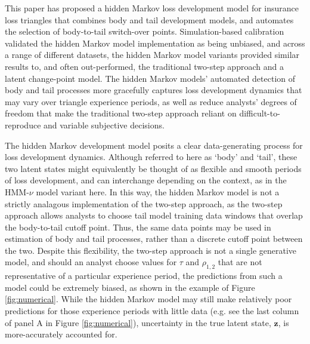 This paper has proposed
a hidden Markov loss development model
for insurance loss triangles that combines
body and tail development models,
and automates the selection of body-to-tail
switch-over points.
Simulation-based calibration validated
the hidden Markov model implementation
as being unbiased, and across
a range of different datasets,
the hidden Markov model variants
provided similar results to, 
and often out-performed,
the traditional two-step approach
and a latent change-point model.
The hidden Markov models'
automated detection
of body and tail processes
more gracefully captures
loss development dynamics
that may vary over triangle
experience periods, as well as
reduce 
analysts' degrees of freedom
that make the traditional
two-step approach reliant
on difficult-to-reproduce
and variable subjective
decisions.

The hidden Markov development model 
posits a clear data-generating process for
loss development dynamics.
Although referred to here as `body' and `tail',
these two latent states might equivalently
be thought of as flexible and smooth
periods of loss development, and can interchange
depending on the context, as in the 
HMM-$\nu$ model variant here.
In this way, the hidden Markov model is not a strictly
analagous implementation of the two-step
approach,
as the two-step approach allows analysts
to choose tail model training data windows
that overlap the body-to-tail cutoff point.
Thus, the same data points may be used in
estimation of body and tail processes, rather
than a discrete cutoff point between the two.
Despite this flexibility, the two-step approach
is not a single generative model, and should an
analyst choose values for $\tau$ and $\rho_{1,2}$
that are not representative of a particular
experience period, the predictions from
such a model could be extremely biased,
as shown in the example of Figure \ref{fig:numerical}.
While the hidden Markov model may still
make relatively poor predictions for those experience
periods with little data (e.g. see the last
column of panel A in Figure \ref{fig:numerical}),
uncertainty in the true latent state, $\bm{z}$,
is more-accurately accounted for.

